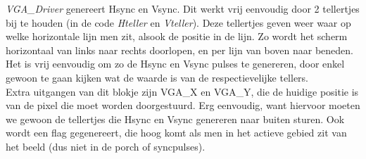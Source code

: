 \documentclass[a4paper,kul]{kulakarticle} %
\begin{document}
\textit{VGA\_Driver} genereert Hsync en Vsync. Dit werkt vrij eenvoudig door 2 tellertjes bij te houden (in de code \textit{Hteller} en \textit{Vteller}). Deze tellertjes geven weer waar op welke horizontale lijn men zit, alsook de positie in de lijn. Zo wordt het scherm horizontaal van links naar rechts doorlopen, en per lijn van boven naar beneden. Het is vrij eenvoudig om zo de Hsync en Vsync pulses te genereren, door enkel gewoon te gaan kijken wat de waarde is van de respectievelijke tellers.\\
Extra uitgangen van dit blokje zijn VGA\_X en VGA\_Y, die de huidige positie is van de pixel die moet worden doorgestuurd. Erg eenvoudig, want hiervoor moeten we gewoon de tellertjes die Hsync en Vsync genereren naar buiten sturen. Ook wordt een flag gegenereert, die hoog komt als men in het actieve gebied zit van het beeld (dus niet in de porch of syncpulses).\\
\end{document}
